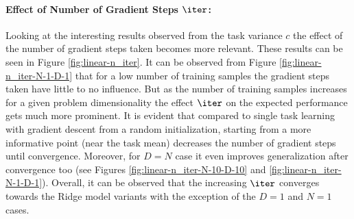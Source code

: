 \paragraph{Effect of Number of Gradient Steps $\iter$:} Looking at the interesting results observed from the task variance $c$  the effect of the number of gradient steps taken becomes more relevant. These results can be seen in Figure \ref{fig:linear-n_iter}. It can be observed from Figure \ref{fig:linear-n_iter-N-1-D-1} that for a low number of training samples the gradient steps taken have little to no influence. But as the number of training samples increases for a given problem dimensionality the effect $\iter$ on the expected performance gets much more prominent. It is evident that compared to single task learning with gradient descent from a random initialization, starting from a more informative point (\eg near the task mean) decreases the number of gradient steps until convergence. Moreover, for $D=N$ case it even improves generalization after convergence too (see Figures \ref{fig:linear-n_iter-N-10-D-10} and \ref{fig:linear-n_iter-N-1-D-1}). Overall, it can be observed that the increasing $\iter$ converges towards the Ridge model variants with the exception of the $D=1$ and $N=1$ cases.
 
